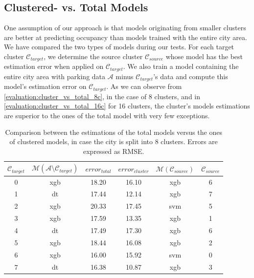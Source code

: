 \subsection{Clustered- vs. Total Models}
\label{small_vs_large}
One assumption of our approach is that models originating from smaller clusters are better at predicting occupancy than models trained with the entire city area.
We have compared the two types of models during our tests.
For each target cluster $\mathcal{C}_{target}$, we determine the source cluster $\mathcal{C}_{source}$ whose model has the best estimation error when applied on $\mathcal{C}_{target}$.
We also train a model containing the entire city area with parking data $\mathcal{A}$ minus $\mathcal{C}_{target}$'s data and compute this model's estimation error on $\mathcal{C}_{target}$.
As we can observe from \autoref{evaluation:cluster_vs_total_8c}, in the case of 8 clusters, and in \autoref{evaluation:cluster_vs_total_16c} for 16 clusters, the cluster's models estimations are superior to the ones of the total model with very few exceptions.

\begin{table}[!ht]
	\centering
	\scriptsize
	\setlength\extrarowheight{5pt}
	\begin{tabular}{ | c | c | c | c | c | c |}
		\hline
		$\mathcal{C}_{target}$ & $\mathcal{M}(\mathcal{A} \setminus \mathcal{C}_{target})$ & $error_{total}$ & $error_{cluster}$ & $\mathcal{M}(\mathcal{C}_{source})$ & $\mathcal{C}_{source}$ \\ \hline
		0 & xgb & 18.20 & 16.10 & xgb & 6 \\ \hline
		1 & dt & 17.44 & 12.14 & xgb & 7 \\ \hline
		2 & xgb & 20.33 & 17.45 & svm & 5 \\ \hline
		3 &	xgb & 17.59 & 13.35 & xgb &	1 \\ \hline
		4 & dt & 17.49 & 17.30 & xgb & 6 \\ \hline
		5 & xgb & 18.44 & 16.08 & xgb &	2 \\ \hline
		6 & xgb & 16.00 & 15.92 & svm &	0 \\ \hline
		7 & dt & 16.38 & 10.87 & xgb & 3 \\ \hline
	\end{tabular}
	\caption{Comparison between the estimations of the total models versus the ones of clustered models, in case the city is split into 8 clusters. Errors are expressed as RMSE.}
	\label{evaluation:cluster_vs_total_8c}
\end{table}

